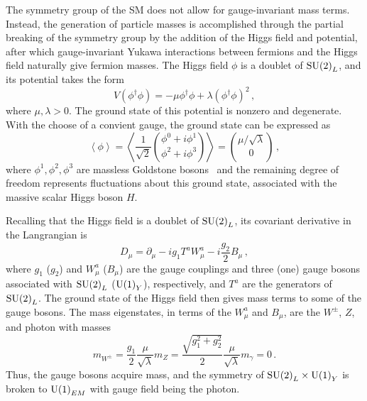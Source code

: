 The symmetry group of the SM does not allow for gauge-invariant mass terms. Instead,
the generation of particle masses is accomplished through the partial breaking of the
symmetry group by the addition of the Higgs field and potential, after which gauge-invariant
Yukawa interactions between fermions and the Higgs field naturally give fermion masses.
The Higgs field $\phi$ is a doublet of ${\rm SU(2)}_L$, and its potential takes the form
\begin{equation}
V(\phi^\dagger\phi) = -\mu\phi^\dagger\phi + \lambda(\phi^\dagger\phi)^2 \,,
\end{equation}
where $\mu,\lambda > 0$. The ground state of this potential is nonzero and degenerate. With the
choose of a convient gauge, the ground state can be expressed as
\begin{equation}
\left\langle \phi \right\rangle =
\left\langle \frac{1}{\sqrt{2}} {\phi^0+i\phi^1 \choose \phi^2+i\phi^3} \right\rangle =
{\mu / \sqrt{\lambda} \choose 0} \,,
\end{equation}
where $\phi^1, \phi^2, \phi^3$ are massless Goldstone
bosons~\cite{1961.Goldstone,1962.Goldstone-Salam-Weinberg.Broken-Symmetries} and the remaining
degree of freedom represents fluctuations about this ground state,
associated with the massive scalar Higgs boson $H$.

Recalling that the Higgs field is a doublet of ${\rm SU(2)}_L$, its covariant derivative in the
Langrangian is
\begin{equation}
D_\mu = \partial_\mu - i g_1 T^a W^a_\mu - i \frac{g_2}{2} B_\mu \,,
\end{equation}
where $g_1$ ($g_2$) and $W^a_\mu$ ($B_\mu$) are the gauge couplings and three (one) gauge bosons
associated with ${\rm SU(2)}_L$ (${\rm U(1)}_Y$), respectively, and $T^a$ are the generators of
${\rm SU(2)}_L$. The ground state of the Higgs field then gives mass terms to some of the gauge bosons.
The mass eigenstates, in terms of the $W^a_\mu$ and $B_\mu$, are the $W^\pm$, $Z$, and photon with
masses
\begin{subequations}
\begin{equation}
m_{W^\pm} = \frac{g_1}{2}\frac{\mu}{\sqrt{\lambda}}
\end{equation}
\begin{equation}
m_Z = \frac{\sqrt{g_1^2+g_2^2}}{2}\frac{\mu}{\sqrt{\lambda}}
\end{equation}
\begin{equation}
m_\gamma = 0 \,.
\end{equation}
\end{subequations}
Thus, the gauge bosons acquire mass, and the symmetry of ${\rm SU(2)}_L \times {\rm U(1)}_Y$ is
broken to ${\rm U(1)}_{EM}$ with gauge field being the photon.  

